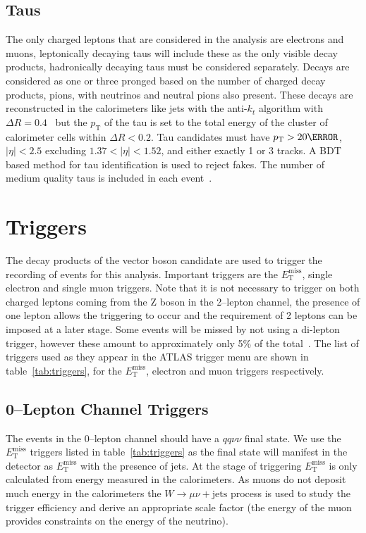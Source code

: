 \subsection{Taus}

The only charged leptons that are considered in the analysis are electrons and
muons, leptonically decaying taus will include these as the only visible decay
products, hadronically decaying taus must be considered separately. Decays are
considered as one or three pronged based on the number of charged decay
products, pions, with neutrinos and neutral pions also present. These decays are
reconstructed in the calorimeters like jets with the anti-$k_t$ algorithm with
$\Delta R = 0.4$~\cite{ATL-PHYS-PUB-2015-045} but the $p_{\mathrm{T}}$ of the
tau is set to the total energy of the cluster of calorimeter cells within
$\Delta R < 0.2$. Tau candidates must have $p_{\mathrm{T}} > 20 \GeV$, $\lvert
\eta \rvert < 2.5$ excluding $1.37 < \lvert \eta \rvert < 1.52$, and either
exactly 1 or 3 tracks. A BDT based method for tau identification is used to
reject fakes. The number of medium quality taus is included in each
event~\cite{TauRecommendation2015,TauRecommendation2016}.

\section{Triggers}
\label{sec:triggers}

The decay products of the vector boson candidate are used to trigger the
recording of events for this analysis. Important triggers are the
$E_{\mathrm{T}}^{\text{miss}}$, single electron and single muon triggers. Note
that it is not necessary to trigger on both charged leptons coming from the Z
boson in the 2--lepton channel, the presence of one lepton allows the triggering
to occur and the requirement of 2 leptons can be imposed at a later stage. Some
events will be missed by not using a di-lepton trigger, however these amount to
approximately only 5\% of the total~\cite{VHObjectNote2019}. The list of
triggers used as they appear in the ATLAS trigger menu are shown in
table~\ref{tab:triggers}, for the $E_{\mathrm{T}}^{\text{miss}}$, electron and
muon triggers respectively.


\subsection{0--Lepton Channel Triggers}
The events in the 0--lepton channel should have a $qq\nu\nu$ final state. We use
the $E_{\mathrm{T}}^{\text{miss}}$ triggers listed in table~\ref{tab:triggers} as the final
state will manifest in the detector as $E_{\mathrm{T}}^{\text{miss}}$ with the presence of
jets. At the stage of triggering $E_{\mathrm{T}}^{\text{miss}}$ is only calculated from
energy measured in the calorimeters. As muons do not deposit much energy in the
calorimeters the $W \to \mu \nu + \text{jets}$ process is used to study the
trigger efficiency and derive an appropriate scale factor (the energy of the
muon provides constraints on the energy of the neutrino).

